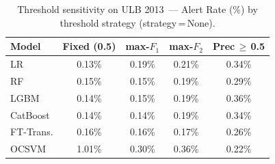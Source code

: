 \begin{table}[ht!]
\centering
\caption{Threshold sensitivity on ULB 2013~--- Alert Rate (\%) by threshold strategy (strategy\,=\,None).}
\label{tab:threshold_ulb_alert}
\begin{tabular}{l c c c c}
\toprule
Model & Fixed (0.5) & max-$F_1$ & max-$F_2$ & Prec\,$\geq$\,0.5 \\
\midrule
LR         & 0.13\% & 0.19\% & 0.21\% & 0.34\% \\
RF         & 0.15\% & 0.15\% & 0.19\% & 0.29\% \\
LGBM       & 0.14\% & 0.15\% & 0.19\% & 0.36\% \\
CatBoost   & 0.14\% & 0.14\% & 0.19\% & 0.34\% \\
FT-Trans.  & 0.16\% & 0.16\% & 0.17\% & 0.26\% \\
OCSVM      & 1.01\% & 0.30\% & 0.36\% & 0.22\% \\
\bottomrule
\end{tabular}
\end{table}